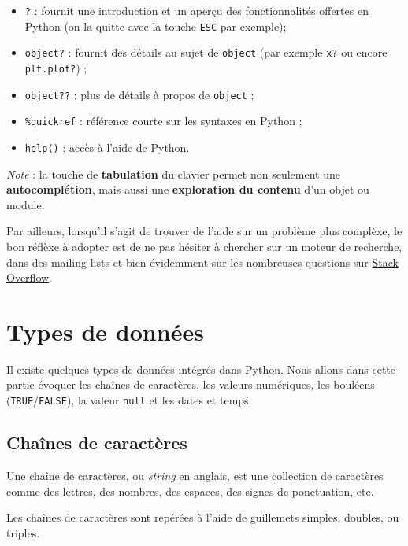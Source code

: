 \documentclass[12pt,]{book}
\providecommand{\tightlist}{%
  \setlength{\itemsep}{0pt}\setlength{\parskip}{0pt}}
\numberwithin{equation}{section}
\numberwithin{countremarque}{section}
\begin{document}
\begin{itemize}
\tightlist
\item
  \texttt{?} : fournit une introduction et un aperçu des fonctionnalités
  offertes en Python (on la quitte avec la touche \texttt{ESC} par
  exemple);
\item
  \texttt{object?} : fournit des détails au sujet de
  \texttt{\textquotesingle{}object\textquotesingle{}} (par exemple
  \texttt{x?} ou encore \texttt{plt.plot?}) ;
\item
  \texttt{object??} : plus de détails à propos de
  \texttt{\textquotesingle{}object\textquotesingle{}} ;
\item
  \texttt{\%quickref} : référence courte sur les syntaxes en Python ;
\item
  \texttt{help()} : accès à l'aide de Python.
\end{itemize}

\emph{Note} : la touche de \textbf{tabulation} du clavier permet non
seulement une \textbf{autocomplétion}, mais aussi une
\textbf{exploration du contenu} d'un objet ou module.

Par ailleurs, lorsqu'il s'agit de trouver de l'aide sur un problème plus
complèxe, le bon réflèxe à adopter est de ne pas hésiter à chercher sur
un moteur de recherche, dans des mailing-lists et bien évidemment sur
les nombreuses questions sur \href{https://stackoverflow.com}{Stack
Overflow}.

\chapter{Types de données}\label{types-de-donnees}

Il existe quelques types de données intégrés dans Python. Nous allons
dans cette partie évoquer les chaînes de caractères, les valeurs
numériques, les bouléens (\texttt{TRUE}/\texttt{FALSE}), la valeur
\texttt{null} et les dates et temps.

\section{Chaînes de caractères}\label{chaines-de-caracteres}

Une chaîne de caractères, ou \emph{string} en anglais, est une
collection de caractères comme des lettres, des nombres, des espaces,
des signes de ponctuation, etc.

Les chaînes de caractères sont repérées à l'aide de guillemets simples,
doubles, ou triples.
\end{document}
